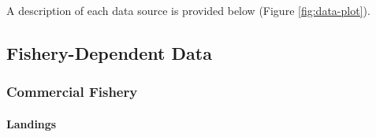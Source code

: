 \documentclass[11pt,
  english,
  a4paper,
]{article}
\begin{document}
A description of each data source is provided below (Figure \ref{fig:data-plot}).

\leavevmode\tagmcend\tagstructend\par


\hypertarget{fishery-dependent-data}{%
\subsection{Fishery-Dependent Data}\label{fishery-dependent-data}}

\leavevmode\tagmcend\tagstructend


\hypertarget{commercial-fishery}{%
\subsubsection{Commercial Fishery}\label{commercial-fishery}}

\leavevmode\tagmcend\tagstructend


\hypertarget{landings}{%
\paragraph{Landings}\label{landings}}

\leavevmode\tagmcend\tagstructend

\end{document}
